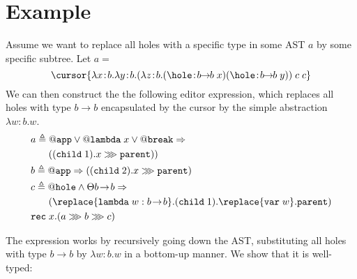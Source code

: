\section{Example}
Assume we want to replace all holes with a specific type in some AST $a$ by some specific subtree. Let $a=$
$$
\cursor{
\lambda x\!:\!b. \lambda y\!:\!b.(
  \lambda z\!:\!b.(\hole\!:\!b\!\! \rightarrow\!\! b\; x)
  (\hole\!:\!b\!\! \rightarrow\!\! b\; y)
)\; c\; c
}
$$
We can then construct the the following editor expression, which replaces all holes with type $b\rightarrow b$ encapsulated by the cursor by the simple abstraction $\lambda w:b.w$.
%
\begin{align*}
&a \triangleq @\texttt{app} \lor @\texttt{lambda}\; x \lor @\texttt{break} \Rightarrow\\ 
&\quad\;\;\;((\texttt{child}\; 1).x \ggg \texttt{parent}))\\
&b \triangleq @\texttt{app} \Rightarrow ((\texttt{child}\; 2).x \ggg \texttt{parent})\\
&c \triangleq @\texttt{hole} \land \Theta b\!\rightarrow\!b \Rightarrow\\
&\quad\;\;\;(\replace{\texttt{lambda}\; w: b\!\rightarrow\!b}.(\texttt{child}\; 1).\replace{\texttt{var}\; w}.\texttt{parent})\\
&\texttt{rec}\; x.(a \ggg b \ggg c)
\end{align*}

The expression works by recursively going down the AST, substituting all holes with type $b\!\rightarrow\!b$ by $\lambda w:b.w$ in a bottom-up manner. We show that it is well-typed:


